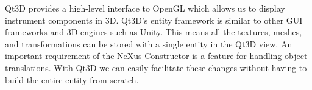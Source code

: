 Qt3D provides a high-level interface to OpenGL which allows us to display instrument components in 3D. Qt3D's entity framework is similar to other GUI frameworks and 3D engines such as Unity. This means all the textures, meshes, and transformations can be stored with a single entity in the Qt3D view. An important requirement of the NeXus Constructor is a feature for handling object translations. With Qt3D we can easily facilitate these changes without having to build the entire entity from scratch. 

\bigskip

